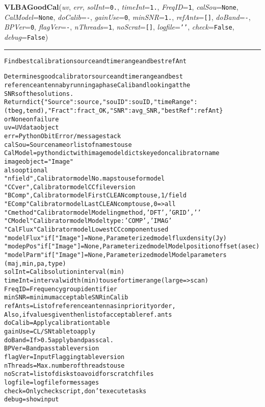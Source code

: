     \begin{boxedminipage}{\textwidth}

    \raggedright \textbf{VLBAGoodCal}(\textit{uv}, \textit{err}, \textit{solInt}=\texttt{0\-.\-}, \textit{timeInt}=\texttt{1\-.\-}, \textit{FreqID}=\texttt{1\-}, \textit{calSou}=\texttt{N\-o\-n\-e\-}, \textit{CalModel}=\texttt{N\-o\-n\-e\-}, \textit{doCalib}=\texttt{-\-}, \textit{gainUse}=\texttt{0\-}, \textit{minSNR}=\texttt{1\-.\-}, \textit{refAnts}=\texttt{[\-]\-}, \textit{doBand}=\texttt{-\-}, \textit{BPVer}=\texttt{0\-}, \textit{flagVer}=\texttt{-\-}, \textit{nThreads}=\texttt{1\-}, \textit{noScrat}=\texttt{[\-]\-}, \textit{logfile}=\texttt{'\-'\-}, \textit{check}=\texttt{F\-a\-l\-s\-e\-}, \textit{debug}=\texttt{F\-a\-l\-s\-e\-})

    \vspace{-1.5ex}

    \rule{\textwidth}{0.5\fboxrule}
\begin{alltt}
Find best calibration source and timerange and best refAnt

Determines good calibrator source and timerange and best
reference antenna by running a phase Calib and looking at the
SNRs of the solutions.
Return dict \{"Source":source, "souID":souID, "timeRange":(tbeg,tend),                 "Fract":fract\_OK, "SNR":avg\_SNR,"bestRef":refAnt\}
            or None on failure
uv         = UV data object
err        = Python Obit Error/message stack
calSou     = Source name or list of names to use
CalModel = python dict with image model dicts keyed on calibrator name
           image object = "Image"
           also optional
           "nfield",    Calibrator model  No. maps to use for model
           "CCver",     Calibrator model CC file version
           "BComp",     Calibrator model First CLEAN comp to use, 1/field
           "EComp"      Calibrator model  Last CLEAN comp to use, 0={\textgreater}all
           "Cmethod"    Calibrator model Modeling method, 'DFT','GRID','    '
           "CModel"     Calibrator model Model type: 'COMP','IMAG'
           "CalFlux"    Calibrator model  Lowest CC component used
           "modelFlux"  if ["Image"]=None, Parameterized model flux density (Jy)
           "modepPos"   if ["Image"]=None, Parameterized model Model position offset (asec)
           "modelParm"  if ["Image"]=None, Parameterized model Model parameters
                        (maj, min, pa, type)
solInt     = Calib solution interval (min)
timeInt    = interval width (min) to use for timerange (large={\textgreater}scan)
FreqID     = Frequency group identifier
minSNR     = minimum acceptable SNR in Calib
refAnts    = List of reference antennas in priority order,
             Also, if values given then list of acceptable ref. ants
doCalib    = Apply calibration table
gainUse    = CL/SN table to apply
doBand     = If {\textgreater}0.5 apply bandpass cal.
BPVer      = Bandpass table version
flagVer    = Input Flagging table version
nThreads   = Max. number of threads to use
noScrat    = list of disks to avoid for scratch files
logfile    = logfile for messages
check      = Only check script, don't execute tasks
debug      = show input\end{alltt}


\end{boxedminipage}
